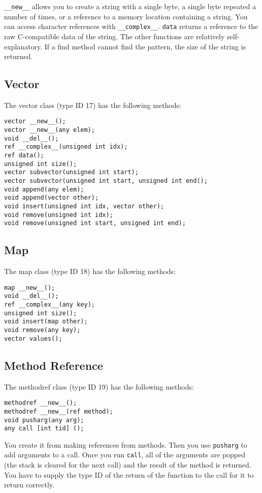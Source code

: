 \documentclass[10pt,a4paper]{article}
\begin{document}
\verb|__new__| allows you to create a string with a single byte, a single byte repeated a number of times, or a reference to a memory location containing a string. You can access character references with \verb|__complex__|. \verb|data| returns a reference to the raw C-compatible data of the string. The other functions are relatively self-explanatory. If a find method cannot find the pattern, the size of the string is returned.

\subsection{Vector}
The vector class (type ID 17) has the following methods:
\begin{verbatim}
vector __new__();
vector __new__(any elem);
void __del__();
ref __complex__(unsigned int idx);
ref data();
unsigned int size();
vector subvector(unsigned int start);
vector subvector(unsigned int start, unsigned int end();
void append(any elem);
void append(vector other);
void insert(unsigned int idx, vector other);
void remove(unsigned int idx);
void remove(unsigned int start, unsigned int end);
\end{verbatim}

\subsection{Map}
The map class (type ID 18) has the following methods:
\begin{verbatim}
map __new__();
void __del__();
ref __complex__(any key);
unsigned int size();
void insert(map other);
void remove(any key);
vector values();
\end{verbatim}

\subsection{Method Reference}
The methodref class (type ID 19) has the following methods:
\begin{verbatim}
methodref __new__();
methodref __new__(ref method);
void pusharg(any arg);
any call [int tid] ();
\end{verbatim}

You create it from making references from methods. Then you use \verb|pusharg| to add arguments to a call. Once you run \verb|call|, all of the arguments are popped (the stack is cleared for the next call) and the result of the method is returned. You have to supply the type ID of the return of the function to the call for it to return correctly.
\end{document}
